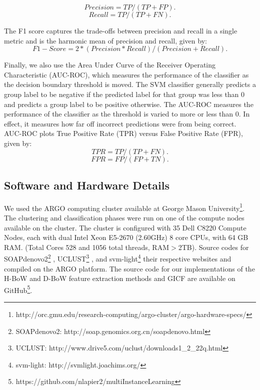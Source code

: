\begin{equation}
Precision = TP / (TP + FP). \label{eqn:prec}
\end{equation}
\begin{equation}
Recall = TP / (TP +FN). \label{eqn:roc}
\end{equation}

The F1 score captures the trade-offs between precision and recall in a
single metric and is the harmonic mean of precision and recall, given by:
\begin{equation}
F1-Score = 2 * (Precision * Recall)/ (Precision + Recall). \label{eqn:f1}
\end{equation}

Finally, we also use the Area Under Curve of the Receiver Operating Characteristic (AUC-ROC), which measures the performance of the classifier as the decision boundary threshold is moved. The SVM classifier generally predicts a group label to be negative if the predicted label for that group was less than 0 and predicts a group label to be positive otherwise. The AUC-ROC measures the performance of the classifier as the threshold is varied to more or less than 0. In effect, it measures how far off incorrect predictions were from being correct. AUC-ROC plots True Positive Rate (TPR) versus False Positive Rate (FPR), given by:
\begin{equation}
TPR  = TP / (TP + FN). \label{eqn:roc}
\end{equation}
\begin{equation}
FPR = FP / (FP + TN). \label{eqn:prec}
\end{equation}

\subsection{Software and Hardware Details}
We used the ARGO computing cluster available at George Mason University\footnote{http://orc.gmu.edu/research-computing/argo-cluster/argo-hardware-specs/}. The clustering and classification phases were run on one of the compute nodes available on the cluster. The cluster is configured with 35 Dell C8220 Compute Nodes, each with dual Intel Xeon E5-2670 (2.60GHz) 8 core CPUs, with 64 GB RAM. (Total Cores 528 and 1056 total threads, RAM$>$2TB). Source codes for 
SOAPdenovo2\footnote{SOAPdenovo2: http://soap.genomics.org.cn/soapdenovo.html} \cite{luo12}, UCLUST\footnote{UCLUST: http://www.drive5.com/uclust/downloads1\_{}2\_{}22q.html}    \cite{Edgar10}, and svm-light\footnote{svm-light: http://svmlight.joachims.org/} \cite{joachims08}
their respective websites and compiled on the ARGO platform. The source code for our implementations of the H-BoW and D-BoW feature extraction methods and GICF are available on GitHub\footnote{https://github.com/nlapier2/multiInstanceLearning}.

